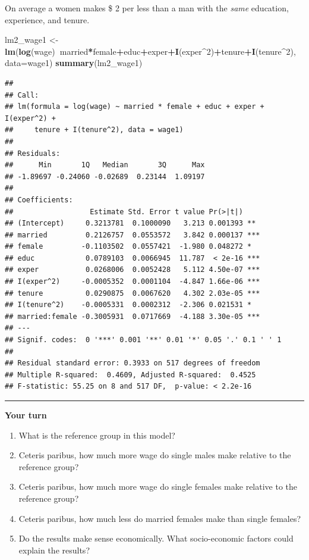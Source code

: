 \documentclass[]{book}
\newenvironment{Shaded}{\begin{snugshade}}{\end{snugshade}}
\newcommand{\DataTypeTok}[1]{\textcolor[rgb]{0.13,0.29,0.53}{#1}}
\newcommand{\DecValTok}[1]{\textcolor[rgb]{0.00,0.00,0.81}{#1}}
\newcommand{\KeywordTok}[1]{\textcolor[rgb]{0.13,0.29,0.53}{\textbf{#1}}}
\newcommand{\NormalTok}[1]{#1}
\newcommand{\OperatorTok}[1]{\textcolor[rgb]{0.81,0.36,0.00}{\textbf{#1}}}
\newcommand{\StringTok}[1]{\textcolor[rgb]{0.31,0.60,0.02}{#1}}
\providecommand{\tightlist}{%
  \setlength{\itemsep}{0pt}\setlength{\parskip}{0pt}}
\begin{document}
On average a women makes \$ 2 per less than a man with the \emph{same}
education, experience, and tenure.

\begin{Shaded}
\begin{Highlighting}[]
\NormalTok{lm2_wage1 <-}\StringTok{ }\KeywordTok{lm}\NormalTok{(}\KeywordTok{log}\NormalTok{(wage)}\OperatorTok{~}\NormalTok{married}\OperatorTok{*}\NormalTok{female}\OperatorTok{+}\NormalTok{educ}\OperatorTok{+}\NormalTok{exper}\OperatorTok{+}\KeywordTok{I}\NormalTok{(exper}\OperatorTok{^}\DecValTok{2}\NormalTok{)}\OperatorTok{+}\NormalTok{tenure}\OperatorTok{+}\KeywordTok{I}\NormalTok{(tenure}\OperatorTok{^}\DecValTok{2}\NormalTok{), }\DataTypeTok{data=}\NormalTok{wage1)}
\KeywordTok{summary}\NormalTok{(lm2_wage1)}
\end{Highlighting}
\end{Shaded}

\begin{verbatim}
## 
## Call:
## lm(formula = log(wage) ~ married * female + educ + exper + I(exper^2) + 
##     tenure + I(tenure^2), data = wage1)
## 
## Residuals:
##      Min       1Q   Median       3Q      Max 
## -1.89697 -0.24060 -0.02689  0.23144  1.09197 
## 
## Coefficients:
##                  Estimate Std. Error t value Pr(>|t|)    
## (Intercept)     0.3213781  0.1000090   3.213 0.001393 ** 
## married         0.2126757  0.0553572   3.842 0.000137 ***
## female         -0.1103502  0.0557421  -1.980 0.048272 *  
## educ            0.0789103  0.0066945  11.787  < 2e-16 ***
## exper           0.0268006  0.0052428   5.112 4.50e-07 ***
## I(exper^2)     -0.0005352  0.0001104  -4.847 1.66e-06 ***
## tenure          0.0290875  0.0067620   4.302 2.03e-05 ***
## I(tenure^2)    -0.0005331  0.0002312  -2.306 0.021531 *  
## married:female -0.3005931  0.0717669  -4.188 3.30e-05 ***
## ---
## Signif. codes:  0 '***' 0.001 '**' 0.01 '*' 0.05 '.' 0.1 ' ' 1
## 
## Residual standard error: 0.3933 on 517 degrees of freedom
## Multiple R-squared:  0.4609, Adjusted R-squared:  0.4525 
## F-statistic: 55.25 on 8 and 517 DF,  p-value: < 2.2e-16
\end{verbatim}

\begin{center}\rule{0.5\linewidth}{\linethickness}\end{center}

\textbf{Your turn}

\begin{enumerate}
\def\labelenumi{\arabic{enumi}.}
\tightlist
\item
  What is the reference group in this model?
\item
  Ceteris paribus, how much more wage do single males make relative to
  the reference group?
\item
  Ceteris paribus, how much more wage do single females make relative to
  the reference group?
\item
  Ceteris paribus, how much less do married females make than single
  females?
\item
  Do the results make sense economically. What socio-economic factors
  could explain the results?
\end{enumerate}
\end{document}
